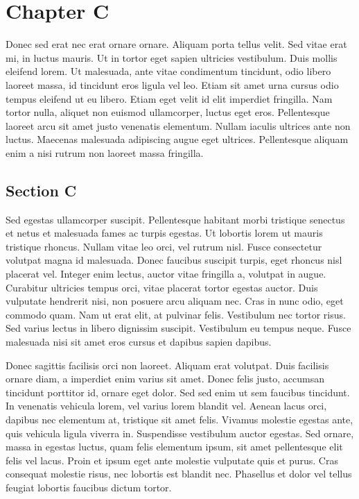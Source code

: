 \chapter{Chapter C}
Donec sed erat nec erat ornare ornare. Aliquam porta tellus velit. Sed vitae erat mi, in luctus mauris. Ut in tortor eget sapien ultricies vestibulum. Duis mollis eleifend lorem. Ut malesuada, ante vitae condimentum tincidunt, odio libero laoreet massa, id tincidunt eros ligula vel leo. Etiam sit amet urna cursus odio tempus eleifend ut eu libero. Etiam eget velit id elit imperdiet fringilla. Nam tortor nulla, aliquet non euismod ullamcorper, luctus eget eros. Pellentesque laoreet arcu sit amet justo venenatis elementum. Nullam iaculis ultrices ante non luctus. Maecenas malesuada adipiscing augue eget ultrices. Pellentesque aliquam enim a nisi rutrum non laoreet massa fringilla.

\section{Section C}
Sed egestas ullamcorper suscipit. Pellentesque habitant morbi tristique senectus et netus et malesuada fames ac turpis egestas. Ut lobortis lorem ut mauris tristique rhoncus. Nullam vitae leo orci, vel rutrum nisl. Fusce consectetur volutpat magna id malesuada. Donec faucibus suscipit turpis, eget rhoncus nisl placerat vel. Integer enim lectus, auctor vitae fringilla a, volutpat in augue. Curabitur ultricies tempus orci, vitae placerat tortor egestas auctor. Duis vulputate hendrerit nisi, non posuere arcu aliquam nec. Cras in nunc odio, eget commodo quam. Nam ut erat elit, at pulvinar felis. Vestibulum nec tortor risus. Sed varius lectus in libero dignissim suscipit. Vestibulum eu tempus neque. Fusce malesuada nisi sit amet eros cursus et dapibus sapien dapibus.

Donec sagittis facilisis orci non laoreet. Aliquam erat volutpat. Duis facilisis ornare diam, a imperdiet enim varius sit amet. Donec felis justo, accumsan tincidunt porttitor id, ornare eget dolor. Sed sed enim ut sem faucibus tincidunt. In venenatis vehicula lorem, vel varius lorem blandit vel. Aenean lacus orci, dapibus nec elementum at, tristique sit amet felis. Vivamus molestie egestas ante, quis vehicula ligula viverra in. Suspendisse vestibulum auctor egestas. Sed ornare, massa in egestas luctus, quam felis elementum ipsum, sit amet pellentesque elit felis vel lacus. Proin et ipsum eget ante molestie vulputate quis et purus. Cras consequat molestie risus, nec lobortis est blandit nec. Phasellus et dolor vel tellus feugiat lobortis faucibus dictum tortor.

